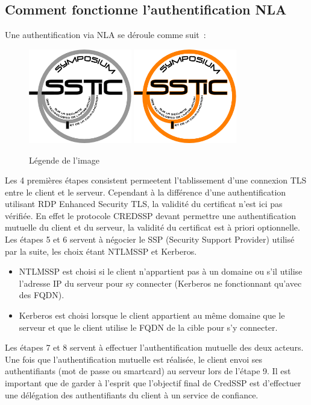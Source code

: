 \subsection{Comment fonctionne l'authentification NLA}
Une authentification via NLA se d\'eroule comme suit :


\begin{figure}[ht]
  \centering
  \ifssticbw
    \includegraphics[width=0.4\textwidth]{AnalyseRDP/img/bw-archi}
  \else
    \includegraphics[width=0.4\textwidth]{AnalyseRDP/img/archi}
  \fi
  \caption{L\'egende de l'image}
  \label{fig:AnalyseRDP:archi}
\end{figure}

Les 4 premières \'etapes consistent permeetent l'tablissement d'une connexion TLS entre le client et le serveur. Cependant à la différence d’une authentification utilisant RDP Enhanced Security TLS, la validité du certificat n’est ici pas vérifiée. En effet le protocole CREDSSP devant permettre une authentification mutuelle du client et du serveur, la validité du certificat est à priori optionnelle.
Les \'etapes 5 et 6 servent à négocier le SSP (Security Support Provider) utilisé par la suite, les choix étant NTLMSSP et Kerberos.
\begin{itemize}
	\item NTLMSSP est choisi si le client n’appartient pas à un domaine ou s'il utilise l’adresse IP du serveur pour sy connecter (Kerberos ne fonctionnant qu'avec des FQDN).
	\item Kerberos est choisi lorsque le client appartient au même domaine que le serveur et que le client utilise le FQDN de la cible pour s'y connecter.
\end{itemize}
Les \'etapes 7 et 8 servent à effectuer l’authentification mutuelle des deux acteurs.
Une fois que l'authentification mutuelle est r\'ealisée, le client envoi ses authentifiants (mot de passe ou smartcard) au serveur lors de l'étape 9. Il est important que de garder à l'esprit que l'objectif final de CredSSP est d'effectuer une délégation des authentifiants du client à un service de confiance. 

